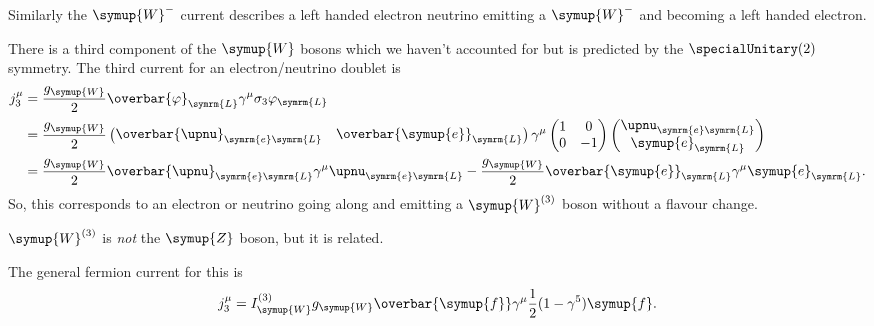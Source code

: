 \documentclass[fleqn]{NotesClass}
\newcommand{\Pparticle}[1]{\symup{#1}}
\newcommand{\Penominus}{\ensuremath{\Pparticle{e}}}
\newcommand{\PZ}{\ensuremath{\Pparticle{Z}}}
\newcommand{\PW}{\ensuremath{\Pparticle{W}}}
\newcommand{\PWm}{\ensuremath{\Pparticle{W}^{-}}}
\newcommand{\Pf}{\ensuremath{\Pparticle{f}}}
\newcommand{\diracadjoint}[1]{\overbar{#1}}
\newcommand{\Left}{\symrm{L}}
\begin{document}
    Similarly the \(\PWm\) current describes a left handed electron neutrino emitting a \(\PWm\) and becoming a left handed electron.
    
    There is a third component of the \(\PW\) bosons which we haven't accounted for but is predicted by the \(\specialUnitary(2)\) symmetry.
    The third current for an electron/neutrino doublet is
    \begin{align}
        j_3^\mu &= \frac{g_{\PW}}{2} \diracadjoint{\varphi}_{\Left}\gamma^\mu \sigma_3\varphi_{\Left}\\
        &= \frac{g_{\PW}}{2} 
        \begin{pmatrix}
            \diracadjoint{\upnu}_{\symrm{e}\Left} & \diracadjoint{\Penominus}_{\Left}
        \end{pmatrix}
        \gamma^\mu
        \begin{pmatrix}
            1 & 0\\
            0 & -1
        \end{pmatrix}
        \begin{pmatrix}
            \upnu_{\symrm{e}\Left}\\
            \Penominus_{\Left}
        \end{pmatrix}
        \\
        &= \frac{g_{\PW}}{2} \diracadjoint{\upnu}_{\symrm{e}\Left} \gamma^\mu \upnu_{\symrm{e}\Left} - \frac{g_{\PW}}{2} \diracadjoint{\Penominus}_{\Left} \gamma^\mu \Penominus_{\Left}.
    \end{align}
    So, this corresponds to an electron or neutrino going along and emitting a \(\PW^{(3)}\) boson without a flavour change.
    \begin{wrn}
        \(\PW^{(3)}\) is \emph{not} the \(\PZ\) boson, but it is related.
    \end{wrn}
    The general fermion current for this is
    \begin{equation}
        j_3^\mu = I_{\PW}^{(3)} g_{\PW} \diracadjoint{\Pf} \gamma^\mu \frac{1}{2}(1 - \gamma^5)\Pf.
    \end{equation}
    
    
    
    \appendixpage
    \begin{appendices}
        
        
        
        
    \end{appendices}
    
\end{document}
